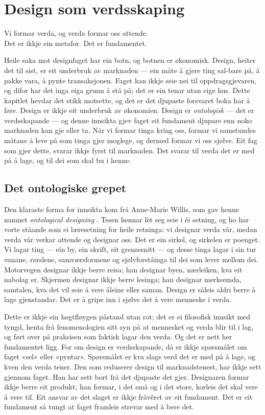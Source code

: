\chapter{Design som verdsskaping}

\begin{motto}
Vi formar verda, og verda formar oss attende.\\ Det er ikkje ein metafor. Det er fundamentet.
\end{motto}

Heile saka mot designfaget har ein botn, og botnen er økonomisk. Design, heiter det til sist, er eit underbruk av marknaden — ein måte å gjere ting sal-bare på, å pakke vara, å pynte transaksjonen. Faget kan ikkje seie nei til oppdragsgjevaren, og difor har det inga eiga grunn å stå på; det er ein tenar utan eige hus. Dette kapitlet hevdar det stikk motsette, og det er det djupaste forsvaret boka har å føre. Design er ikkje eit underbruk av økonomien. Design er \emph{ontologisk} — det er verdsskapande — og denne innsikta gjev faget eit fundament djupare enn noko marknaden kan gje eller ta. Når vi formar tinga kring oss, formar vi samstundes måtane å leve på som tinga gjer moglege, og dermed formar vi oss sjølve. Eit fag som gjer dette, svarar ikkje fyrst til marknaden. Det svarar til verda det er med på å lage, og til dei som skal bu i henne.

\section{Det ontologiske grepet}

Den klaraste forma for innsikta kom frå Anne-Marie Willis, som gav henne namnet \emph{ontological designing} \autocite{willis2006ontological}. Tesen hennar lèt seg seie i éi setning, og ho har vorte ståande som ei læresetning for heile retninga: vi designar verda vår, medan verda vår verkar attende og designar oss. Det er ein sirkel, og sirkelen er poenget. Vi lagar ting — ein by, ein skrift, eit grensesnitt — og desse tinga lagar i sin tur vanane, rørslene, samværsformene og sjølvforståinga til dei som lever mellom dei. Motorvegen designar ikkje berre reisa; han designar byen, nærleiken, kva eit nabolag er. Skjermen designar ikkje berre lesinga; han designar merksemda, samtalen, kva det vil seie å vere åleine eller saman. Design er såleis aldri berre å lage gjenstandar. Det er å gripe inn i sjølve det å vere menneske i verda.

Dette er ikkje ein høgtfløygen påstand utan rot; det er ei filosofisk innsikt med tyngd, henta frå fenomenologien sitt syn på at mennesket og verda blir til i lag, og ført over på praksisen som faktisk lagar den verda. Og det er nett her fundamentet ligg. For om design er verdsskapande, då er ikkje spørsmålet om faget «sel» eller «pyntar». Spørsmålet er kva slags verd det er med på å lage, og kven den verda tener. Den som reduserer design til marknadstenest, har ikkje sett gjennom faget. Han har sett bort frå det djupaste det gjer. Designaren formar ikkje berre eit produkt; han formar, i det små og i det store, korleis det skal vere å vere til. Eit ansvar av det slaget er ikkje fråvêret av eit fundament. Det er eit fundament så tungt at faget framleis strevar med å bere det.


